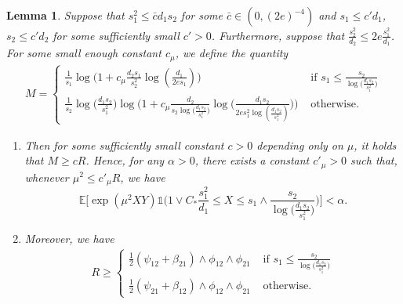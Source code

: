 \documentclass{article}
\newcommand{\EE}{\mathbb{E}}
\newcommand{\one}{\mathds{1}}
\newcommand{\Ct}{C_{*}}
\newtheorem{lemma}{Lemma}
\theoremstyle{remark}
\begin{document}
\begin{lemma}\label{lem_simplify_s1d1big_truncchi2}
    Suppose that $s_1^2 \leq \bar{c}d_1s_2$ for some $\bar{c} \in (0,(2e)^{-4})$ and $s_1 \leq c'd_1$, $s_2 \leq c' d_2$ for some sufficiently small $c'>0$. Furthermore, suppose that $\frac{s^2_2}{d_2} \leq 2e\frac{s_1^2}{d_1}$. 
    For some small enough constant $c_\mu$, we define the quantity 
    \begin{align*}
        M = \begin{cases}
            \frac{1}{s_1} \log\Big(1 + c_\mu \frac{d_2s_1}{s_2^2}\log(\frac{d_1}{2es_1})\Big) & \text{ if } s_1 \leq \frac{s_2}{\log\big(\frac{d_1s_2}{s_1^2}\big)}\\
            \frac{1}{s_2}\log\big(\frac{d_1s_2}{s_1^2}\big)\log\Big(1 + c_\mu \frac{d_2}{s_2\log\big(\frac{d_1s_2}{s_1^2}\big)}\log\big(\frac{d_1s_2}{2es_1^2\log(\frac{d_1s_2}{s_1^2})}\big)\Big) & \text{ otherwise.}
        \end{cases}
    \end{align*}
    \begin{enumerate}
        \item 
    Then for some sufficiently small constant $c>0$ depending only on $\mu$, it holds that $M \geq cR$. 
    Hence, for any $\alpha>0$, there exists a constant $c'_\mu>0$ such that, whenever $\mu^2 \leq c'_\mu R$, we have
    \[\EE\Big[\exp(\mu^2XY)\one\Big( 1 \vee \Ct \frac{s_1^2}{d_1} \leq X \leq s_1\wedge\frac{s_2}{\log\big(\frac{d_1s_2}{s_1^2}\big)}\Big)\Big] < \alpha.\]
    \item Moreover, we have
    \begin{align}
        R \geq \begin{cases}
            \frac{1}{2}(\psi_{12} + \beta_{21}) \land \phi_{12} \land \phi_{21} & \text{ if } s_1 \leq \frac{s_2}{\log\big(\frac{d_1s_2}{s_1^2}\big)}\\
            \frac{1}{2}(\psi_{21} + \beta_{12}) \land \phi_{12} \land \phi_{21} & \text{ otherwise. }
        \end{cases} \label{eq_lower_bound_M}
    \end{align}
    \end{enumerate}
\end{lemma}
\end{document}
